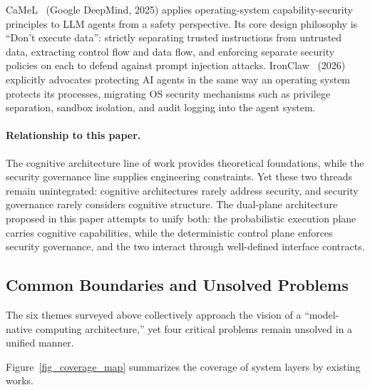 CaMeL~\cite{debenedetti2025camel} (Google DeepMind, 2025) applies operating-system capability-security principles to LLM agents from a safety perspective.
Its core design philosophy is ``Don't execute data'': strictly separating trusted instructions from untrusted data, extracting control flow and data flow, and enforcing separate security policies on each to defend against prompt injection attacks.
IronClaw~\cite{ironclaw2025} (2026) explicitly advocates protecting AI agents in the same way an operating system protects its processes, migrating OS security mechanisms such as privilege separation, sandbox isolation, and audit logging into the agent system.

\paragraph{Relationship to this paper.}
The cognitive architecture line of work provides theoretical foundations, while the security governance line supplies engineering constraints.
Yet these two threads remain unintegrated: cognitive architectures rarely address security, and security governance rarely considers cognitive structure.
The dual-plane architecture proposed in this paper attempts to unify both: the probabilistic execution plane carries cognitive capabilities, while the deterministic control plane enforces security governance, and the two interact through well-defined interface contracts.

\subsection{Common Boundaries and Unsolved Problems}
\label{sec:related-gap}

The six themes surveyed above collectively approach the vision of a ``model-native computing architecture,'' yet four critical problems remain unsolved in a unified manner.

Figure~\ref{fig_coverage_map} summarizes the coverage of system layers by existing works.


